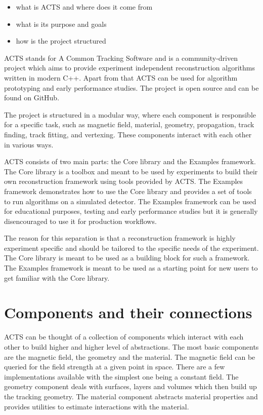\begin{itemize}
    \color{red}
    \item what is ACTS and where does it come from
    \item what is its purpose and goals
    \item how is the project structured
\end{itemize}

ACTS stands for A Common Tracking Software and is a community-driven project which aims to provide experiment independent reconstruction algorithms written in modern C++. Apart from that ACTS can be used for algorithm prototyping and early performance studies. The project is open source and can be found on GitHub.

The project is structured in a modular way, where each component is responsible for a specific task, such as magnetic field, material, geometry, propagation, track finding, track fitting, and vertexing. These components interact with each other in various ways.

ACTS consists of two main parts: the Core library and the Examples framework. The Core library is a toolbox and meant to be used by experiments to build their own reconstruction framework using tools provided by ACTS. The Examples framework demonstrates how to use the Core library and provides a set of tools to run algorithms on a simulated detector. The Examples framework can be used for educational purposes, testing and early performance studies but it is generally disencouraged to use it for production workflows.

The reason for this separation is that a reconstruction framework is highly experiment specific and should be tailored to the specific needs of the experiment. The Core library is meant to be used as a building block for such a framework. The Examples framework is meant to be used as a starting point for new users to get familiar with the Core library.

\section{Components and their connections}

ACTS can be thought of a collection of components which interact with each other to build higher and higher level of abstractions. The most basic components are the magnetic field, the geometry and the material. The magnetic field can be queried for the field strength at a given point in space. There are a few implementations available with the simplest one being a constant field. The geometry component deals with surfaces, layers and volumes which then build up the tracking geometry. The material component abstracts material properties and provides utilities to estimate interactions with the material.

